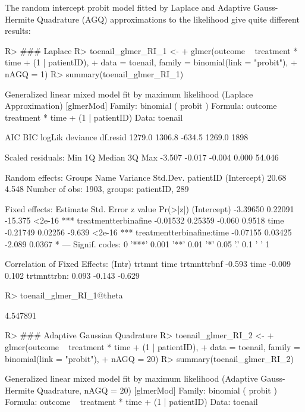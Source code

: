 \documentclass[article,nojss,shortnames]{jss}\usepackage[]{graphicx}\usepackage[]{xcolor}
\begin{document}
The random intercept probit model fitted by Laplace and Adaptive
Gauss-Hermite Quadrature (AGQ) approximations to the
likelihood give quite different results:
\begin{Schunk}
\begin{Sinput}
R> ### Laplace
R> toenail_glmer_RI_1 <- 
+      glmer(outcome ~ treatment * time + (1 | patientID),
+            data = toenail, family = binomial(link = "probit"), 
+            nAGQ = 1)
R> summary(toenail_glmer_RI_1)
\end{Sinput}
\begin{Soutput}
Generalized linear mixed model fit by maximum likelihood (Laplace
  Approximation) [glmerMod]
 Family: binomial  ( probit )
Formula: outcome ~ treatment * time + (1 | patientID)
   Data: toenail

     AIC      BIC   logLik deviance df.resid 
  1279.0   1306.8   -634.5   1269.0     1898 

Scaled residuals: 
   Min     1Q Median     3Q    Max 
-3.507 -0.017 -0.004  0.000 54.046 

Random effects:
 Groups    Name        Variance Std.Dev.
 patientID (Intercept) 20.68    4.548   
Number of obs: 1903, groups:  patientID, 289

Fixed effects:
                          Estimate Std. Error z value Pr(>|z|)    
(Intercept)               -3.39650    0.22091 -15.375   <2e-16 ***
treatmentterbinafine      -0.01532    0.25359  -0.060   0.9518    
time                      -0.21749    0.02256  -9.639   <2e-16 ***
treatmentterbinafine:time -0.07155    0.03425  -2.089   0.0367 *  
---
Signif. codes:  0 '***' 0.001 '**' 0.01 '*' 0.05 '.' 0.1 ' ' 1

Correlation of Fixed Effects:
            (Intr) trtmnt time  
trtmnttrbnf -0.593              
time        -0.009  0.102       
trtmnttrbn:  0.093 -0.143 -0.629
\end{Soutput}
\begin{Sinput}
R> toenail_glmer_RI_1@theta
\end{Sinput}
\begin{Soutput}
[1] 4.547891
\end{Soutput}
\begin{Sinput}
R> ### Adaptive Gaussian Quadrature
R> toenail_glmer_RI_2 <- 
+      glmer(outcome ~ treatment * time + (1 | patientID),
+            data = toenail, family = binomial(link = "probit"), 
+            nAGQ = 20)
R> summary(toenail_glmer_RI_2)
\end{Sinput}
\begin{Soutput}
Generalized linear mixed model fit by maximum likelihood (Adaptive
  Gauss-Hermite Quadrature, nAGQ = 20) [glmerMod]
 Family: binomial  ( probit )
Formula: outcome ~ treatment * time + (1 | patientID)
   Data: toenail


\end{Soutput}
\end{Schunk}
\end{document}
